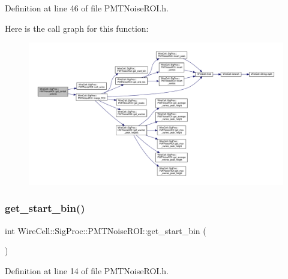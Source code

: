 Definition at line 46 of file P\+M\+T\+Noise\+R\+O\+I.\+h.

Here is the call graph for this function\+:
\nopagebreak
\begin{figure}[H]
\begin{center}
\leavevmode
\includegraphics[width=350pt]{class_wire_cell_1_1_sig_proc_1_1_p_m_t_noise_r_o_i_a7031b3d183118e24d277e7c8deb50a1d_cgraph}
\end{center}
\end{figure}
\mbox{\label{class_wire_cell_1_1_sig_proc_1_1_p_m_t_noise_r_o_i_a4122e466578dee161bee0219bceec33e}} 
\subsubsection{\texorpdfstring{get\+\_\+start\+\_\+bin()}{get\_start\_bin()}}
{\footnotesize\ttfamily int Wire\+Cell\+::\+Sig\+Proc\+::\+P\+M\+T\+Noise\+R\+O\+I\+::get\+\_\+start\+\_\+bin (\begin{DoxyParamCaption}{ }\end{DoxyParamCaption})\hspace{0.3cm}{\ttfamily [inline]}}



Definition at line 14 of file P\+M\+T\+Noise\+R\+O\+I.\+h.

